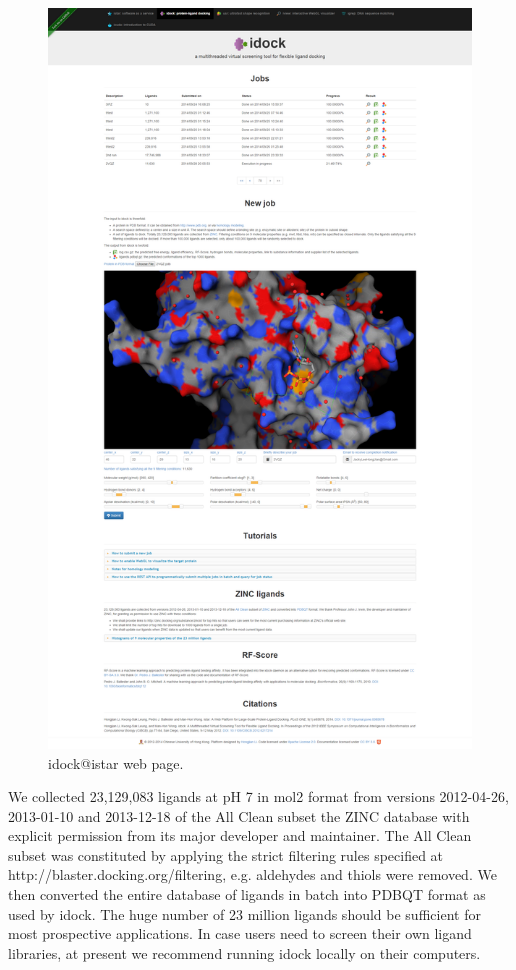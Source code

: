 \begin{figure}
\centering
\includegraphics[width=\linewidth]{../istar/idock.png}
\caption{idock@istar web page.}
\label{istar:idock}
\end{figure}

We collected 23,129,083 ligands at pH 7 in mol2 format from versions 2012-04-26, 2013-01-10 and 2013-12-18 of the All Clean subset the ZINC database \citep{532,1178} with explicit permission from its major developer and maintainer. The All Clean subset was constituted by applying the strict filtering rules specified at http://blaster.docking.org/filtering, e.g. aldehydes and thiols were removed. We then converted the entire database of ligands in batch into PDBQT format as used by idock. The huge number of 23 million ligands should be sufficient for most prospective applications. In case users need to screen their own ligand libraries, at present we recommend running idock locally on their computers.

